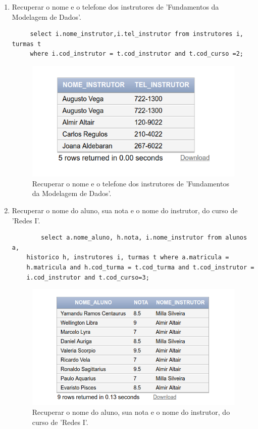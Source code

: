 \documentclass[
article,			%
11pt,				%
oneside,			%
a4paper,			%
english,			%
brazil,				%
sumario=tradicional
]{abntex2}
\begin{document}
\begin{enumerate}
	 	
	 	\item  Recuperar o nome e o telefone dos instrutores
	 	de 'Fundamentos da Modelagem de Dados'.
	 	\begin{verbatim}
	 select i.nome_instrutor,i.tel_instrutor from instrutores i, turmas t
	 where i.cod_instrutor = t.cod_instrutor and t.cod_curso =2;
	 	\end{verbatim}
	 	\begin{center}
	 		\begin{figure}[H]
	 			\centering
	 			\includegraphics[scale=0.5]{./at-10.png}
	 			\caption{Recuperar o nome e o telefone dos instrutores
	 				de 'Fundamentos da Modelagem de Dados'.}
	 			\label{rota-1}
	 		\end{figure}
	 	\end{center}
	 		\item  Recuperar o nome do aluno, sua nota e o nome
	 		do instrutor, do curso de 'Redes I'.
	 	\begin{verbatim}
		select a.nome_aluno, h.nota, i.nome_instrutor from alunos a,
	historico h, instrutores i, turmas t where a.matricula =
	h.matricula and h.cod_turma = t.cod_turma and t.cod_instrutor =
	i.cod_instrutor and t.cod_curso=3;
	 	\end{verbatim}
	 	\begin{center}
	 		\begin{figure}[H]
	 			\centering
	 			\includegraphics[scale=0.5]{./at-09.png}
	 			\caption{Recuperar o nome do aluno, sua nota e o nome
	 				do instrutor, do curso de 'Redes I'.}
	 			\label{rota-1}
	 		\end{figure}
	 	\end{center}
	 	
	 	
 	\end{enumerate}
	 	


	
	
\end{document}
